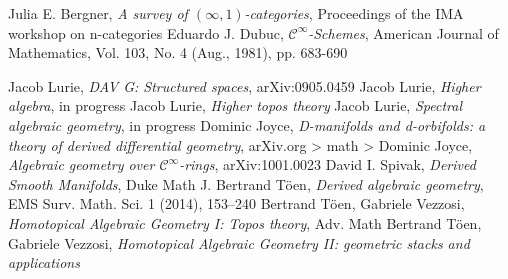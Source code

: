 \documentclass[11pt]{amsart}
\numberwithin{equation}{section}
\theoremstyle{definition}
\theoremstyle{remark}
\numberwithin{equation}{section}
\newcommand{\cinf}{{\mathcal C}^{\infty}}
\begin{document}

\begin{thebibliography}{10}

 Julia E. Bergner, {\it A survey of $(\infty, 1)$-categories}, Proceedings of the IMA workshop on n-categories
 Eduardo J. Dubuc, {\it $\cinf$-Schemes}, American Journal of Mathematics, Vol. 103, No. 4 (Aug., 1981), pp. 683-690

 Jacob Lurie, {\it DAV G: Structured spaces}, arXiv:0905.0459
 Jacob Lurie, {\it Higher algebra}, in progress
 Jacob Lurie, {\it Higher topos theory}
 Jacob Lurie, {\it Spectral algebraic geometry}, in progress
 Dominic Joyce, {\it D-manifolds and d-orbifolds: a theory of derived differential geometry}, arXiv.org > math > 
 Dominic Joyce, {\it Algebraic geometry over $\cinf$-rings}, arXiv:1001.0023
 David I. Spivak, {\it Derived Smooth Manifolds}, Duke Math J.
 Bertrand T\"oen, {\it Derived algebraic geometry}, EMS Surv. Math. Sci. 1 (2014), 153–240
 Bertrand T\"oen, Gabriele Vezzosi, {\it Homotopical Algebraic Geometry I: Topos theory}, Adv. Math
 Bertrand T\"oen, Gabriele Vezzosi, {\it Homotopical Algebraic Geometry II: geometric stacks and applications}
\end{thebibliography}
\end{document}
